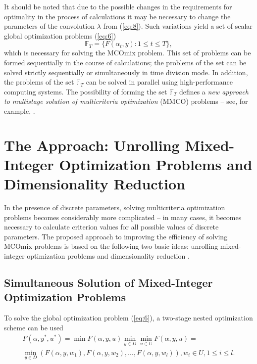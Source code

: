 \documentclass{svproc}
\begin{document}
It should be noted that due to the possible changes in the requirements for optimality in the process of calculations it may be necessary to change the parameters of the convolution $\lambda$ from (\ref{eq:8}). Such variations yield a set of scalar global optimization problems (\ref{eq:6})
\begin{equation}\label{eq:10}
\mathbb{F}_T=\{F(\alpha_t,y):1 \leq t \leq T\},
\end{equation}
which is necessary for solving the MCOmix problem. This set of problems can be formed sequentially in the course of calculations; the problems of the set can be solved strictly sequentially or simultaneously in time division mode. In addition, the problems of the set $\mathbb{F}_T$ can be solved in parallel using high-performance computing systems. The possibility of forming the set $\mathbb{F}_T$ defines a \textit{new approach to multistage solution of multicriteria optimization} (MMCO) problems -- see, for example, \cite{c22}.


\section{The Approach: Unrolling Mixed-Integer Optimization Problems and Dimensionality Reduction}\label{sec:3}

In the presence of discrete parameters, solving multicriteria optimization  problems becomes considerably  more complicated -- in many cases, it becomes necessary to calculate criterion values for all possible values of discrete parameters. The proposed approach to improving the efficiency of solving MCOmix problems is based on the following two basic ideas: unrolling mixed-integer optimization problems \cite{c23} and dimensionality reduction \cite{c24,c25}.

\subsection{Simultaneous Solution of Mixed-Integer Optimization Problems} \label{subsec:31}

To solve the global optimization problem (\ref{eq:6}), a two-stage nested optimization scheme can be used
\begin{equation}\label{eq:11}
\begin{matrix}
  F(\alpha,y^*,u^*)=\min{F(\alpha,y,u)} \min_{y \in D} \min_{u \in U}{F(\alpha,y,u)} =\\ 
  \min_{y \in D}(F(\alpha,y,w_1 ),F(\alpha,y,w_2 ), \dots, F(\alpha,y,w_l )),w_i\in U,1 \leq i \leq l.
\end{matrix}
\end{equation}
\end{document}
